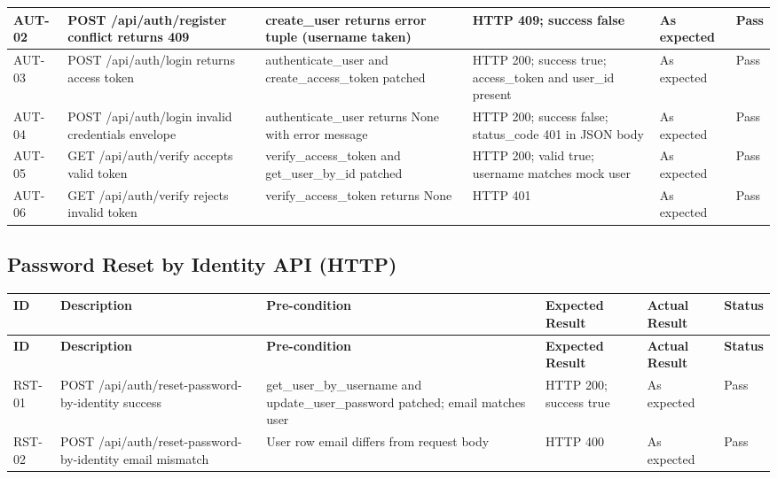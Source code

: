 \begin{appendices}
{\begin{longtable}{|p{1.2cm}|p{3.0cm}|p{3.0cm}|p{3.2cm}|p{2.2cm}|p{1.1cm}|}
AUT-02 &
POST /api/auth/register conflict returns 409 &
create\_user returns error tuple (username taken) &
HTTP 409; success false &
As expected &
Pass \\
\hline

AUT-03 &
POST /api/auth/login returns access token &
authenticate\_user and create\_access\_token patched &
HTTP 200; success true; access\_token and user\_id present &
As expected &
Pass \\
\hline

AUT-04 &
POST /api/auth/login invalid credentials envelope &
authenticate\_user returns None with error message &
HTTP 200; success false; status\_code 401 in JSON body &
As expected &
Pass \\
\hline

AUT-05 &
GET /api/auth/verify accepts valid token &
verify\_access\_token and get\_user\_by\_id patched &
HTTP 200; valid true; username matches mock user &
As expected &
Pass \\
\hline

AUT-06 &
GET /api/auth/verify rejects invalid token &
verify\_access\_token returns None &
HTTP 401 &
As expected &
Pass \\
\hline

\end{longtable}

\subsection*{Password Reset by Identity API (HTTP)}
\begin{longtable}{|p{1.2cm}|p{3.0cm}|p{3.0cm}|p{3.2cm}|p{2.2cm}|p{1.1cm}|}
\hline
\textbf{ID} & \textbf{Description} & \textbf{Pre-condition} & \textbf{Expected Result} & \textbf{Actual Result} & \textbf{Status} \\
\hline
\endfirsthead
\hline
\textbf{ID} & \textbf{Description} & \textbf{Pre-condition} & \textbf{Expected Result} & \textbf{Actual Result} & \textbf{Status} \\
\hline
\endhead
\hline
\endfoot

RST-01 &
POST /api/auth/reset-password-by-identity success &
get\_user\_by\_username and update\_user\_password patched; email matches user &
HTTP 200; success true &
As expected &
Pass \\
\hline

RST-02 &
POST /api/auth/reset-password-by-identity email mismatch &
User row email differs from request body &
HTTP 400 &
As expected &
Pass \\
\hline


\end{longtable}}
\end{appendices}
